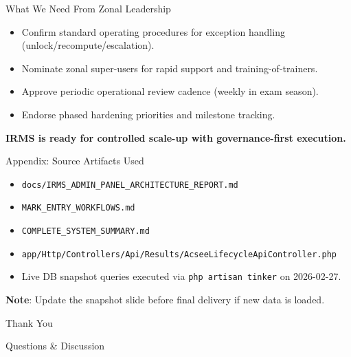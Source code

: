 \documentclass[aspectratio=169,11pt]{beamer}
\begin{document}
\begin{frame}{What We Need From Zonal Leadership}
\begin{itemize}
  \item Confirm standard operating procedures for exception handling (unlock/recompute/escalation).
  \item Nominate zonal super-users for rapid support and training-of-trainers.
  \item Approve periodic operational review cadence (weekly in exam season).
  \item Endorse phased hardening priorities and milestone tracking.
\end{itemize}

\vspace{0.4cm}
\centering
\Large\textbf{IRMS is ready for controlled scale-up with governance-first execution.}
\end{frame}

\begin{frame}{Appendix: Source Artifacts Used}
\footnotesize
\begin{itemize}
  \item \texttt{docs/IRMS\_ADMIN\_PANEL\_ARCHITECTURE\_REPORT.md}
  \item \texttt{MARK\_ENTRY\_WORKFLOWS.md}
  \item \texttt{COMPLETE\_SYSTEM\_SUMMARY.md}
  \item \texttt{app/Http/Controllers/Api/Results/AcseeLifecycleApiController.php}
  \item Live DB snapshot queries executed via \texttt{php artisan tinker} on 2026-02-27.
\end{itemize}
\vspace{0.25cm}
\textbf{Note}: Update the snapshot slide before final delivery if new data is loaded.
\end{frame}

\begin{frame}
\centering
\Huge Thank You
\vspace{0.4cm}

\Large Questions \& Discussion
\end{frame}
\end{document}
